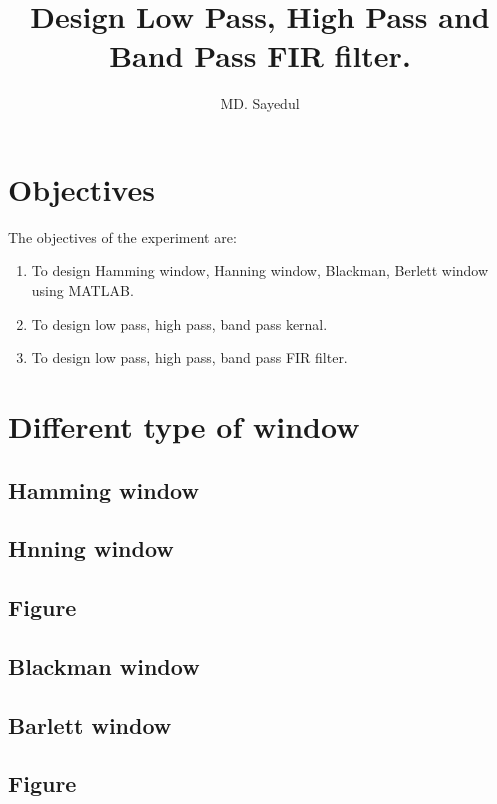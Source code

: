 \documentclass[12pt, letterpaper]{article}
\title{Design Low Pass, High Pass and Band Pass FIR filter.}
\author{MD. Sayedul}
\begin{document}

\tableofcontents
\newpage
\section{Objectives}
The objectives of the experiment are:
\begin{enumerate}
    \item To design Hamming window, Hanning window, Blackman, Berlett window using MATLAB.
    \item To design low pass, high pass, band pass kernal.
    \item To design low pass, high pass, band pass FIR filter.
\end{enumerate}

\section{Different type of window}

\subsection{Hamming window}

\subsection{Hnning window}

\subsection{Figure}

\subsection{Blackman window}

\subsection{Barlett window}

\subsection{Figure}
\end{document}

